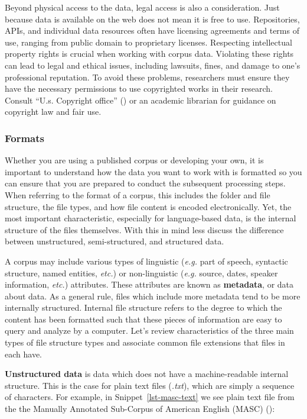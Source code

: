 \documentclass[
  letterpaper,
]{book}
\theoremstyle{definition}
\theoremstyle{remark}
\begin{document}
Beyond physical access to the data, legal access is also a
consideration. Just because data is available on the web does not mean
it is free to use. Repositories, APIs, and individual data resources
often have licensing agreements and terms of use, ranging from public
domain to proprietary licenses. Respecting intellectual property rights
is crucial when working with corpus data. Violating these rights can
lead to legal and ethical issues, including lawsuits, fines, and damage
to one's professional reputation. To avoid these problems, researchers
must ensure they have the necessary permissions to use copyrighted works
in their research. Consult {``U.s. Copyright office''}
() or an academic librarian for
guidance on copyright law and fair use.

\subsubsection{Formats}\label{formats}

Whether you are using a published corpus or developing your own, it is
important to understand how the data you want to work with is formatted
so you can ensure that you are prepared to conduct the subsequent
processing steps. When referring to the format of a corpus, this
includes the folder and file structure, the file types, and how file
content is encoded electronically. Yet, the most important
characteristic, especially for language-based data, is the internal
structure of the files themselves. With this in mind less discuss the
difference between unstructured, semi-structured, and structured data.

A corpus may include various types of linguistic (\emph{e.g.} part of
speech, syntactic structure, named entities, \emph{etc.}) or
non-linguistic (\emph{e.g.} source, dates, speaker information,
\emph{etc.}) attributes. These attributes are known as
\textbf{metadata}, or data about data. As a general rule, files which
include more metadata tend to be more internally structured. Internal
file structure refers to the degree to which the content has been
formatted such that these pieces of information are easy to query and
analyze by a computer. Let's review characteristics of the three main
types of file structure types and associate common file extensions that
files in each have.

\textbf{Unstructured data} is data which does not have a
machine-readable internal structure. This is the case for plain text
files (\emph{.txt}), which are simply a sequence of characters. For
example, in Snippet~\ref{lst-masc-text} we see plain text file from the
the Manually Annotated Sub-Corpus of American English (MASC)
():
\end{document}
